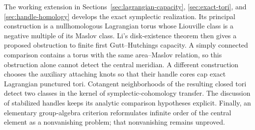 \documentclass[11pt]{amsart}
\theoremstyle{definition}
\theoremstyle{remark}
\begin{document}
The working extension in Sections~\ref{sec:lagrangian-capacity},
\ref{sec:exact-tori}, and
\ref{sec:handle-homology} develops the exact symplectic realization.
Its principal construction is a nullhomologous Lagrangian torus whose
Liouville class is a negative multiple of its Maslov class. Li's
disk-existence theorem then gives a proposed obstruction to finite
first Gutt--Hutchings capacity. A simply connected comparison contains
a torus with the same area--Maslov relation, so this obstruction alone
cannot detect the central meridian. A different construction chooses
the auxiliary attaching knots so that their handle cores cap exact
Lagrangian punctured tori. Cotangent neighborhoods of the resulting
closed tori detect two classes in the kernel of symplectic-cohomology
transfer. The discussion of stabilized handles keeps its analytic
comparison hypotheses explicit. Finally, an elementary group-algebra
criterion reformulates infinite order of the central element as a
nonvanishing problem; that nonvanishing remains unproved.
\end{document}
